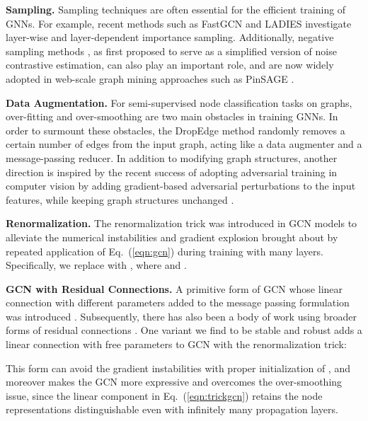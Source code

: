\documentclass[sigconf,screen,nonacm]{acmart} \usepackage{booktabs}
\newcommand{\minisection}[1]{\vspace{5pt}\noindent\textbf{#1.}}
\begin{document}
	\minisection{Sampling}
Sampling techniques \citep{chen2018fastgcn,zou2019layer,hamilton2017inductive} are often essential for the efficient training of GNNs.
For example, recent methods such as FastGCN \citep{chen2018fastgcn} and LADIES \citep{zou2019layer} investigate layer-wise and layer-dependent importance sampling.
Additionally, negative sampling methods \citep{mikolov2013distributed}, as first proposed to serve as a simplified version of noise contrastive estimation, can also play an important role, and are now widely adopted in web-scale graph mining approaches such as PinSAGE \citep{ying2018graph}.


	\minisection{Data Augmentation}
	For semi-supervised node classification tasks on graphs, over-fitting and over-smoothing \citep{li2018deeper} are two main obstacles in training GNNs.
	In order to surmount these obstacles, the DropEdge method \citep{rong2019dropedge} randomly removes a certain number of edges from the input graph, acting like a data augmenter and a message-passing reducer.
	In addition to modifying graph structures, another direction is inspired by the recent success of adopting adversarial training in computer vision \citep{xie2020adversarial} by adding gradient-based adversarial perturbations to the input features, while keeping graph structures unchanged \citep{kong2020flag}.
	
	\minisection{Renormalization}
	The renormalization trick was introduced in GCN models \citep{kipf2016semi} to alleviate the numerical instabilities and gradient explosion brought about by repeated application of Eq.~(\ref{eqn:gcn}) during training with many layers.  Specifically, we replace  with , where  and .
	
	\minisection{GCN with Residual Connections}
	A primitive form of GCN whose linear connection with different parameters added to the message passing formulation was introduced \citep{kipf2016semi}.
	Subsequently, there has also been a body of work using broader forms of residual connections \citep{rossi2020sign,li2020deepergcn}.
	One variant we find to be stable and robust adds a linear connection with free parameters to GCN with the renormalization trick:
	
	This form can avoid the gradient instabilities with proper initialization of , and moreover makes the GCN more expressive and overcomes the over-smoothing issue, since the linear component in Eq.~(\ref{eqn:trickgcn}) retains the node representations distinguishable even with infinitely many propagation layers.
\end{document}
